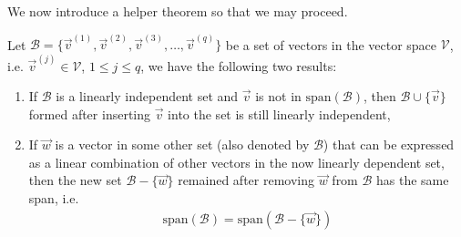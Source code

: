 We now introduce a helper theorem so that we may proceed.
\begin{thm}
\label{thm:plusminus}
Let $\mathcal{B} = \{\vec{v}^{(1)}, \vec{v}^{(2)}, \vec{v}^{(3)}, \ldots, \vec{v}^{(q)}\}$ be a set of vectors in the vector space $\mathcal{V}$, i.e. $\vec{v}^{(j)} \in \mathcal{V}$, $1 \leq j \leq q$, we have the following two results:
\begin{enumerate}[label=(\alph*)]
    \item If $\mathcal{B}$ is a linearly independent set and $\vec{v}$ is not in $\text{span}(\mathcal{B})$, then $\mathcal{B} \cup \{\vec{v}\}$ formed after inserting $\vec{v}$ into the set is still linearly independent,
    \item If $\vec{w}$ is a vector in some other set (also denoted by $\mathcal{B}$) that can be expressed as a linear combination of other vectors in the now linearly dependent set, then the new set $\mathcal{B} - \{\vec{w}\}$ remained after removing $\vec{w}$ from $\mathcal{B}$ has the same span, i.e.
    \begin{align*}
    \text{span}(\mathcal{B}) = \text{span}(\mathcal{B} - \{\vec{w}\})
    \end{align*}
\end{enumerate}
\end{thm}
